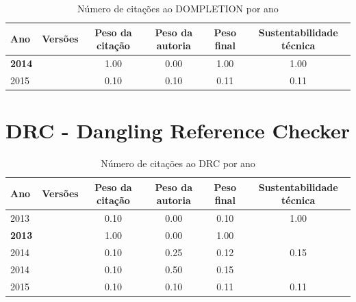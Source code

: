 \begin{table}[H]
\caption{Número de citações ao DOMPLETION por ano}
\centering
\begin{tabular}{| l | c | c | c | c | c |}
  \hline
  Ano & Versões & Peso da citação & Peso da autoria & Peso final & Sustentabilidade técnica \\
  \hline
            {\bf 2014}
          &
          
          &
          1.00
          &
          0.00
          &
          1.00
          &
            {\color{blue} 1.00}
          \\
\hline
            2015
          &
          
          &
          0.10
          &
          0.10
          &
          0.11
          &
            {\color{red} 0.11}
          \\
\hline
\end{tabular}
\end{table}



\section{DRC - Dangling Reference Checker}


\begin{table}[H]
\caption{Número de citações ao DRC  por ano}
\centering
\begin{tabular}{| l | c | c | c | c | c |}
  \hline
  Ano & Versões & Peso da citação & Peso da autoria & Peso final & Sustentabilidade técnica \\
  \hline
            2013
          &
          
          &
          0.10
          &
          0.00
          &
          0.10
          &
            {\color{blue} 1.00}
          \\
            {\bf 2013}
          &
          
          &
          1.00
          &
          0.00
          &
          1.00
          &
          \\
\hline
            2014
          &
          
          &
          0.10
          &
          0.25
          &
          0.12
          &
            {\color{red} 0.15}
          \\
            2014
          &
          
          &
          0.10
          &
          0.50
          &
          0.15
          &
          \\
\hline
            2015
          &
          
          &
          0.10
          &
          0.10
          &
          0.11
          &
            {\color{red} 0.11}
          \\
\hline
\end{tabular}
\end{table}



